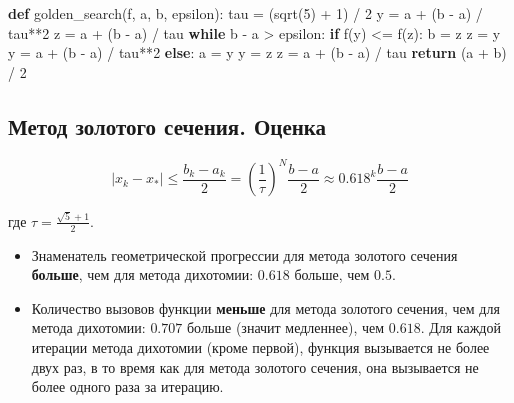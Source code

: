 \documentclass[
  russian,
  letterpaper,
  DIV=11,
  numbers=noendperiod]{scrartcl}
\newenvironment{Shaded}{\begin{snugshade}}{\end{snugshade}}
\newcommand{\ControlFlowTok}[1]{\textcolor[rgb]{0.00,0.23,0.31}{\textbf{#1}}}
\newcommand{\DecValTok}[1]{\textcolor[rgb]{0.68,0.00,0.00}{#1}}
\newcommand{\KeywordTok}[1]{\textcolor[rgb]{0.00,0.23,0.31}{\textbf{#1}}}
\newcommand{\NormalTok}[1]{\textcolor[rgb]{0.00,0.23,0.31}{#1}}
\newcommand{\OperatorTok}[1]{\textcolor[rgb]{0.37,0.37,0.37}{#1}}
\providecommand{\tightlist}{%
  \setlength{\itemsep}{0pt}\setlength{\parskip}{0pt}}
\begin{document}
\begin{Shaded}
\begin{Highlighting}[]
\KeywordTok{def}\NormalTok{ golden\_search(f, a, b, epsilon):}
\NormalTok{   tau }\OperatorTok{=}\NormalTok{ (sqrt(}\DecValTok{5}\NormalTok{) }\OperatorTok{+} \DecValTok{1}\NormalTok{) }\OperatorTok{/} \DecValTok{2}
\NormalTok{   y }\OperatorTok{=}\NormalTok{ a }\OperatorTok{+}\NormalTok{ (b }\OperatorTok{{-}}\NormalTok{ a) }\OperatorTok{/}\NormalTok{ tau}\OperatorTok{**}\DecValTok{2}
\NormalTok{   z }\OperatorTok{=}\NormalTok{ a }\OperatorTok{+}\NormalTok{ (b }\OperatorTok{{-}}\NormalTok{ a) }\OperatorTok{/}\NormalTok{ tau}
   \ControlFlowTok{while}\NormalTok{ b }\OperatorTok{{-}}\NormalTok{ a }\OperatorTok{\textgreater{}}\NormalTok{ epsilon:}
      \ControlFlowTok{if}\NormalTok{ f(y) }\OperatorTok{\textless{}=}\NormalTok{ f(z):}
\NormalTok{         b }\OperatorTok{=}\NormalTok{ z}
\NormalTok{         z }\OperatorTok{=}\NormalTok{ y}
\NormalTok{         y }\OperatorTok{=}\NormalTok{ a }\OperatorTok{+}\NormalTok{ (b }\OperatorTok{{-}}\NormalTok{ a) }\OperatorTok{/}\NormalTok{ tau}\OperatorTok{**}\DecValTok{2}
      \ControlFlowTok{else}\NormalTok{:}
\NormalTok{         a }\OperatorTok{=}\NormalTok{ y}
\NormalTok{         y }\OperatorTok{=}\NormalTok{ z}
\NormalTok{         z }\OperatorTok{=}\NormalTok{ a }\OperatorTok{+}\NormalTok{ (b }\OperatorTok{{-}}\NormalTok{ a) }\OperatorTok{/}\NormalTok{ tau}
   \ControlFlowTok{return}\NormalTok{ (a }\OperatorTok{+}\NormalTok{ b) }\OperatorTok{/} \DecValTok{2}
\end{Highlighting}
\end{Shaded}

\subsection{Метод золотого сечения.
Оценка}\label{ux43cux435ux442ux43eux434-ux437ux43eux43bux43eux442ux43eux433ux43e-ux441ux435ux447ux435ux43dux438ux44f.-ux43eux446ux435ux43dux43aux430}

\[
|x_{k} - x_*| \leq \frac{b_{k} - a_{k}}{2} = \left( \frac{1}{\tau} \right)^{N} \frac{b - a}{2} \approx 0.618^k\frac{b - a}{2}
\]

где \(\tau = \frac{\sqrt{5} + 1}{2}\).

\begin{itemize}
\tightlist
\item
  Знаменатель геометрической прогрессии для метода золотого сечения
  \textbf{больше}, чем для метода дихотомии: \(0.618\) больше, чем
  \(0.5\).
\item
  Количество вызовов функции \textbf{меньше} для метода золотого
  сечения, чем для метода дихотомии: \(0.707\) больше (значит
  медленнее), чем \(0.618\). Для каждой итерации метода дихотомии (кроме
  первой), функция вызывается не более двух раз, в то время как для
  метода золотого сечения, она вызывается не более одного раза за
  итерацию.
\end{itemize}
\end{document}
